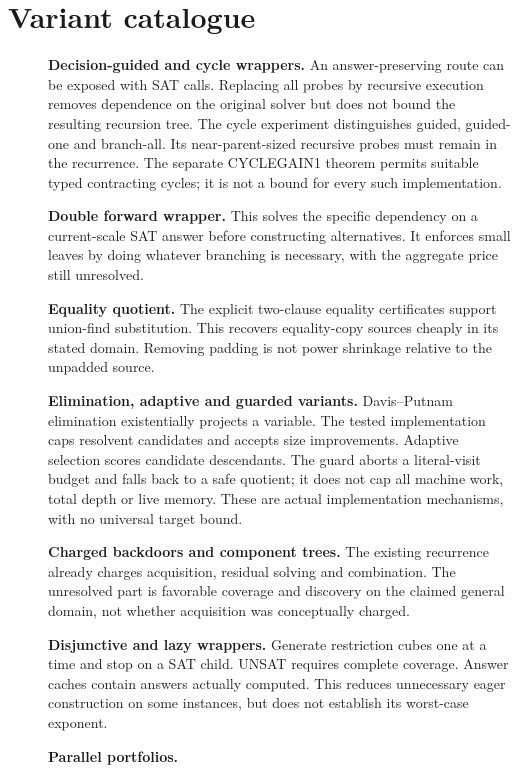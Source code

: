 \documentclass[11pt]{article}
\begin{document}
\section*{Variant catalogue}
\begin{description}
\item[] \textbf{Decision-guided and cycle wrappers.}
An answer-preserving route can be exposed with SAT calls. Replacing all probes
by recursive execution removes dependence on the original solver but does not
bound the resulting recursion tree. The cycle experiment distinguishes guided,
guided-one and branch-all. Its near-parent-sized recursive probes must remain
in the recurrence. The separate CYCLEGAIN1 theorem permits suitable typed
contracting cycles; it is not a bound for every such implementation.
\item[] \textbf{Double forward wrapper.}
This solves the specific dependency on a current-scale SAT answer before
constructing alternatives. It enforces small leaves by doing whatever branching
is necessary, with the aggregate price still unresolved.
\item[] \textbf{Equality quotient.}
The explicit two-clause equality certificates support union-find substitution.
This recovers equality-copy sources cheaply in its stated domain. Removing
padding is not power shrinkage relative to the unpadded source.
\item[] \textbf{Elimination, adaptive and guarded variants.}
Davis--Putnam elimination existentially projects a variable. The tested implementation
caps resolvent candidates and accepts size improvements. Adaptive selection scores
candidate descendants. The guard aborts a literal-visit budget and falls back to
a safe quotient; it does not cap all machine work, total depth or live memory.
These are actual implementation mechanisms, with no universal target bound.
\item[] \textbf{Charged backdoors and component trees.}
The existing recurrence already charges acquisition, residual solving and
combination. The unresolved part is favorable coverage and discovery on the
claimed general domain, not whether acquisition was conceptually charged.
\item[] \textbf{Disjunctive and lazy wrappers.}
Generate restriction cubes one at a time and stop on a SAT child. UNSAT requires
complete coverage. Answer caches contain answers actually computed. This reduces
unnecessary eager construction on some instances, but does not establish its
worst-case exponent.
\item[] \textbf{Parallel portfolios.}

\end{description}
\end{document}
